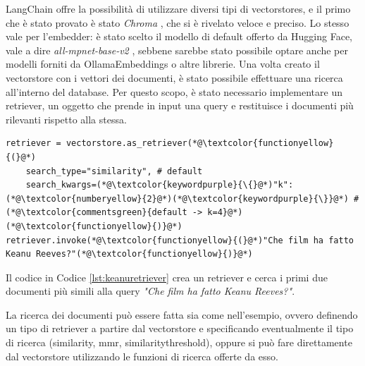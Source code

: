 LangChain offre la possibilità di utilizzare diversi tipi di vectorstores, e il primo che è stato provato è stato \textit{Chroma} \cite{chromadb}, che si è rivelato veloce e preciso. Lo stesso vale per l'embedder: è stato scelto il modello di default offerto da Hugging Face, vale a dire \textit{all-mpnet-base-v2} \cite{mpnet}, sebbene sarebbe stato possibile optare anche per modelli forniti da OllamaEmbeddings o altre librerie. Una volta creato il vectorstore con i vettori dei documenti, è stato possibile effettuare una ricerca all'interno del database. Per questo scopo, è stato necessario implementare un retriever, un oggetto che prende in input una query e restituisce i documenti più rilevanti rispetto alla stessa.
\begin{lstlisting}[label=lst:keanuretriever, caption={Creazione del retriever e primo retrieving}]
retriever = vectorstore.as_retriever(*@\textcolor{functionyellow}{(}@*)
    search_type="similarity", # default
    search_kwargs=(*@\textcolor{keywordpurple}{\{}@*)"k": (*@\textcolor{numberyellow}{2}@*)(*@\textcolor{keywordpurple}{\}}@*) # (*@\textcolor{commentsgreen}{default -> k=4}@*)
(*@\textcolor{functionyellow}{)}@*)
retriever.invoke(*@\textcolor{functionyellow}{(}@*)"Che film ha fatto Keanu Reeves?"(*@\textcolor{functionyellow}{)}@*)
\end{lstlisting}
Il codice in Codice \ref{lst:keanuretriever} crea un retriever e cerca i primi due documenti più simili alla query \textit{"Che film ha fatto Keanu Reeves?"}.

La ricerca dei documenti può essere fatta sia come nell'esempio, ovvero definendo un tipo di retriever a partire dal vectorstore e specificando eventualmente il tipo di ricerca (similarity, mmr, similarity\textunderscore threshold), oppure si può fare direttamente dal vectorstore utilizzando le funzioni di ricerca offerte da esso.

